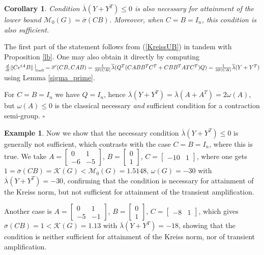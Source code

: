 \documentclass[12pt, a4paper,reqno]{amsart}
\newtheorem{corollary}{\bf Corollary}
\renewenvironment{proof}{\noindent {\bf Proof: }}{\rm\\}
\theoremstyle{definition}
\newtheorem{example}{Example}{\rm}
\begin{document}
\begin{corollary}
Condition $\overline{\lambda}(Y+Y^T)\leq 0$ is also necessary for attainment of the lower bound $\mathcal M_0(G)=\overline{\sigma}(CB)$. Moreover, 
when $C=B=I_n$, this condition is also sufficient.
\end{corollary}

\begin{proof}
    The first part of the statement follows from (\ref{KreissUB}) in tandem with Proposition \ref{lb}. One may also obtain
    it directly by computing
    $\frac{d}{dt}\| C e^{tA}B\| \left\vert\begin{array}{c} \! \\ \vspace{-.4cm} \! \end{array}\right._{\!\!\!\!\!\!\!t=0}
    = \overline{\sigma}'(CB,CAB)
    = \frac{1}{2 \overline{\sigma}(CB)} \overline{\lambda}(Q^T(CABB^TC^T+ CBB^TATC^T)Q) =
    \frac{1}{2\overline{\sigma}(CB)} \overline{\lambda}(Y+Y^T)$ using Lemma \ref{sigma_prime}.
    
    For $C=B=I_n$ we have $Q=I_n$, hence
    $\overline{\lambda}(Y+Y^T)=\overline{\lambda}(A+A^T) = 2\omega(A)$, but $\omega(A) \leq 0$ is the classical 
    necessary {\it and} sufficient condition for a contraction semi-group.
    \hfill $\square$
\end{proof}




\begin{example}
Now we show that the necessary condition $\overline{\lambda}(Y+Y^T)\leq 0$ is generally not sufficient, which contrasts with the case $C=B=I_n$, where this is true.
We take 
$A = \begin{bmatrix} 0&1\\-6&-5\end{bmatrix}$, $B= \begin{bmatrix} 0\\1\end{bmatrix}$, $C= \begin{bmatrix} -10&1\end{bmatrix}$, where
one gets $1 = \overline{\sigma}(CB) =  \mathcal K(G) < \mathcal M_0(G) = 1.5148$, $\omega(G) = -30$ with
$\overline{\lambda}(Y+Y^T) = -30$, confirming that the condition is necessary for attainment of the Kreiss norm, but not sufficient for attainment of the transient amplification.  

Another case is
$A = \begin{bmatrix}0&1\\-5&-1 \end{bmatrix}$, $B = \begin{bmatrix}0\\1\end{bmatrix}$, $C=\begin{bmatrix} -8 & 1\end{bmatrix}$, which gives
$\overline{\sigma}(CB) = 1< \mathcal K(G) = 1.13$ with $\overline{\lambda}(Y+Y^T) = -18$, showing that the condition is neither 
sufficient for attainment of the Kreiss norm, nor of transient amplification. 

\end{example}
\end{document}
